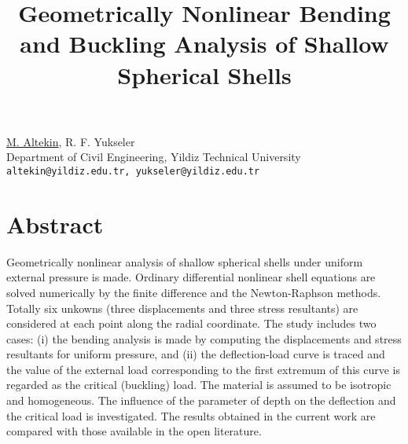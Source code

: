 \title{Geometrically Nonlinear Bending and Buckling Analysis of Shallow Spherical Shells}
\author{} \institute{}
\maketitle

\begin{center}
{\large \underline{M. Altekin}, R. F. Yukseler}\\
Department of Civil Engineering, Yildiz Technical University\\
{\tt altekin@yildiz.edu.tr, yukseler@yildiz.edu.tr}
\end{center}

\section*{Abstract}
Geometrically nonlinear analysis of shallow spherical shells under uniform external pressure is made. Ordinary differential nonlinear shell equations are solved numerically by the finite difference and the Newton-Raphson methods. Totally six unkowns (three displacements and three stress resultants) are considered at each point along the radial coordinate. The study includes two cases: (i) the bending analysis is made by computing the displacements and stress resultants for uniform pressure, and (ii) the deflection-load curve is traced and the value of the external load corresponding to the first extremum of this curve is regarded as the critical (buckling) load. The material is assumed to be isotropic and homogeneous. The influence of the parameter of depth on the deflection and the critical load is investigated. The results obtained in the current work are compared with those available in the open literature.

